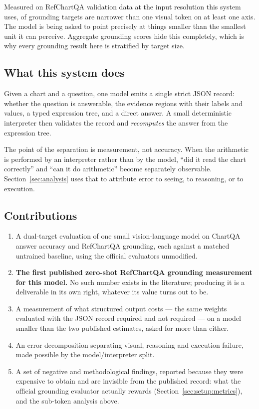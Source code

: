 Measured on RefChartQA validation data at the input resolution this system uses,  of
grounding targets are narrower than one visual token on at least one axis. The model is being asked
to point precisely at things smaller than the smallest unit it can perceive. Aggregate grounding
scores hide this completely, which is why every grounding result here is stratified by target size.

\subsection{What this system does}

Given a chart and a question, one model emits a single strict JSON record: whether the question is
answerable, the evidence regions with their labels and values, a typed expression tree, and a direct
answer. A small deterministic interpreter then validates the record and \emph{recomputes} the answer
from the expression tree.

The point of the separation is measurement, not accuracy. When the arithmetic is performed by an
interpreter rather than by the model, ``did it read the chart correctly'' and ``can it do
arithmetic'' become separately observable. Section~\ref{sec:analysis} uses that to attribute error
to seeing, to reasoning, or to execution.

\subsection{Contributions}

\begin{enumerate}
  \item A dual-target evaluation of one small vision-language model on ChartQA answer accuracy and
        RefChartQA grounding, each against a matched untrained baseline, using the official
        evaluators unmodified.
  \item \textbf{The first published zero-shot RefChartQA grounding measurement for this model.} No
        such number exists in the literature; producing it is a deliverable in its own right,
        whatever its value turns out to be.
  \item A measurement of what structured output costs --- the same weights evaluated with the JSON
        record required and not required --- on a model smaller than the two published estimates,
        asked for more than either.
  \item An error decomposition separating visual, reasoning and execution failure, made possible by
        the model/interpreter split.
  \item A set of negative and methodological findings, reported because they were expensive to
        obtain and are invisible from the published record: what the official grounding evaluator
        actually rewards (Section~\ref{sec:setup:metrics}), and the sub-token analysis above.
\end{enumerate}


